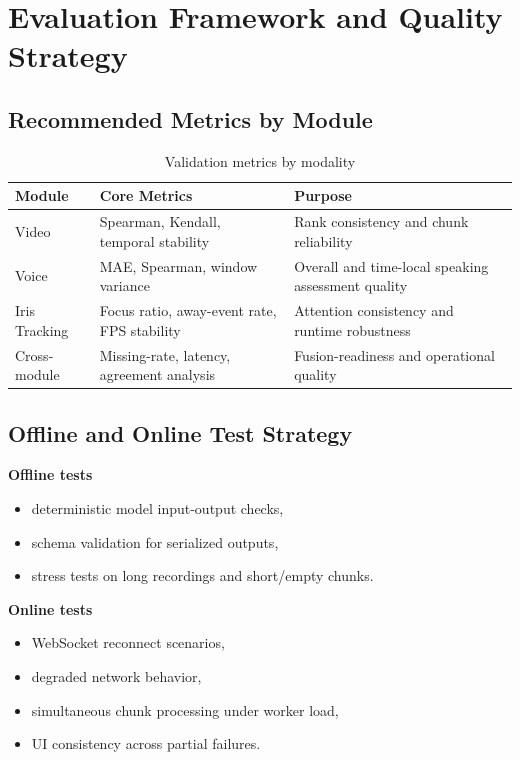 \documentclass[12pt,a4paper]{report}
\begin{document}
\chapter{Evaluation Framework and Quality Strategy}
\section{Recommended Metrics by Module}
\begin{table}[H]
\centering
\caption{Validation metrics by modality}
\begin{tabularx}{\textwidth}{>{\raggedright\arraybackslash}p{2.8cm} >{\raggedright\arraybackslash}p{3.0cm} Y}
\toprule
\textbf{Module} & \textbf{Core Metrics} & \textbf{Purpose} \\
\midrule
Video & Spearman, Kendall, temporal stability & Rank consistency and chunk reliability \\
Voice & MAE, Spearman, window variance & Overall and time-local speaking assessment quality \\
Iris Tracking & Focus ratio, away-event rate, FPS stability & Attention consistency and runtime robustness \\
Cross-module & Missing-rate, latency, agreement analysis & Fusion-readiness and operational quality \\
\bottomrule
\end{tabularx}
\end{table}

\section{Offline and Online Test Strategy}
\textbf{Offline tests}
\begin{itemize}[leftmargin=1.5em]
\item deterministic model input-output checks,
\item schema validation for serialized outputs,
\item stress tests on long recordings and short/empty chunks.
\end{itemize}

\textbf{Online tests}
\begin{itemize}[leftmargin=1.5em]
\item WebSocket reconnect scenarios,
\item degraded network behavior,
\item simultaneous chunk processing under worker load,
\item UI consistency across partial failures.
\end{itemize}
\end{document}

